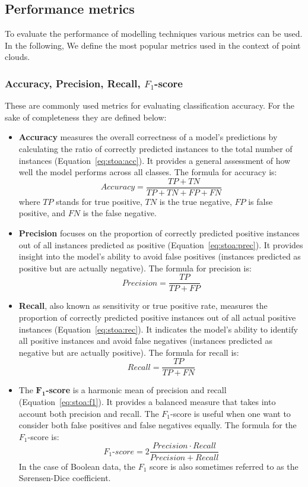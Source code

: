 \subsection{Performance metrics}
To evaluate the performance of modelling techniques various metrics can be used. In the following, We define the most popular metrics used in the context of point clouds. 
\subsubsection{Accuracy, Precision, Recall, $F_1$-score}
These are commonly used metrics for evaluating classification accuracy. For the sake of completeness they are defined below:
\begin{itemize}
\item \textbf{Accuracy} measures the overall correctness of a model's predictions by calculating the ratio of correctly predicted instances to the total number of instances (Equation~\ref{eq:stoa:acc}). It provides a general assessment of how well the model performs across all classes. The formula for accuracy is:
\begin{equation}
    Accuracy = \frac{TP+TN}{TP+TN+FP+FN}
    \label{eq:stoa:acc}
\end{equation}
where $TP$ stands for true positive, $TN$ is the true negative, $FP$ is false positive, and $FN$ is the false negative. 
\item \textbf{Precision} focuses on the proportion of correctly predicted positive instances out of all instances predicted as positive (Equation~\ref{eq:stoa:prec}). It provides insight into the model's ability to avoid false positives (instances predicted as positive but are actually negative). The formula for precision is:
\begin{equation}
    Precision = \frac{TP}{TP + FP}
    \label{eq:stoa:prec}
\end{equation}
\item
\textbf{Recall}, also known as sensitivity or true positive rate, measures the proportion of correctly predicted positive instances out of all actual positive instances (Equation~\ref{eq:stoa:rec}). It indicates the model's ability to identify all positive instances and avoid false negatives (instances predicted as negative but are actually positive). The formula for recall is:
\begin{equation}
    Recall = \frac{TP}{TP + FN}
    \label{eq:stoa:rec}
\end{equation}
\item
The $\mathbf{F_1}$\textbf{-score} is a harmonic mean of precision and recall (Equation~\ref{eq:stoa:f1}). It provides a balanced measure that takes into account both precision and recall. The $F_1$-score is useful when one want to consider both false positives and false negatives equally. The formula for the $F_1$-score is:
\begin{equation}
    F_1\text{-}score = 2\frac{ Precision \cdot Recall}{Precision + Recall}
    \label{eq:stoa:f1}
\end{equation}
In the case of Boolean data, the $F_1$ score is also sometimes referred to as the S\o rensen-Dice coefficient.
\end{itemize}


